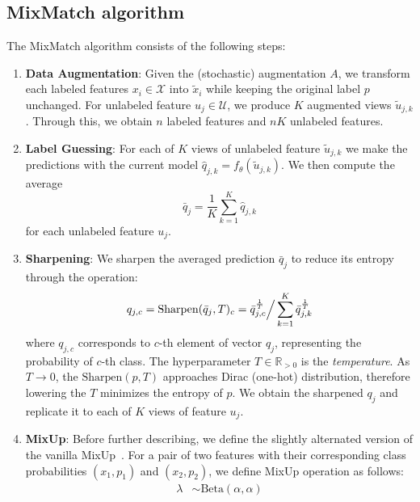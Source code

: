 \subsection{MixMatch algorithm}
The MixMatch algorithm consists of the following steps:
\begin{enumerate}
    \item \textbf{Data Augmentation}\label{data-augmentation}: Given the (stochastic) augmentation $A$, we transform each labeled features $x_i \in \mathcal{X}$ into $\tilde{x}_i$ while keeping the 
        original label $p$ unchanged. For unlabeled feature $u_j \in \mathcal{U}$, we produce $K$ augmented views $\tilde{u}_{j,k}$. Through this, we obtain $n$ labeled features and
        $nK$ unlabeled features. 
    \item \textbf{Label Guessing}\label{label-guessing}: For each of $K$ views of unlabeled feature $\tilde{u}_{j,k}$ we make the predictions with the current model 
        $\hat{q}_{j,k} = f_\theta(\tilde{u}_{j,k})$. We then compute the average
            \begin{equation*}
                \bar{q}_{j} = \frac{1}{K}\sum_{k=1}^K \hat{q}_{j,k}
            \end{equation*}
        for each unlabeled feature $u_j$.
    \item \textbf{Sharpening}\label{sharpening}: We sharpen the averaged prediction $\bar{q}_{j}$ to reduce its entropy through the operation:
            \begin{equation*}
                q_{j,c} = \text{Sharpen}(\bar{q}_{j},T)_c = \bar{q}_{j,c}^{\frac{1}{T}} \Big{/} \sum_{k=1}^{K} \bar{q}_{j,k}^{\frac{1}{T}} 
            \end{equation*}
        where $q_{j,c}$ corresponds to $c$-th element of vector $q_{j}$, representing the probability of $c$-th class. 
        The hyperparameter $T \in \mathbb{R}_{>0}$ is the \textit{temperature}. As $T\to 0$, the $\text{Sharpen}(p,T)$ approaches Dirac (one-hot) distribution, 
        therefore lowering the $T$ minimizes the entropy of $p$. We obtain the sharpened $q_{j}$ and replicate it to each of $K$ views of feature $u_{j}$.
    \item \textbf{MixUp}: Before further describing, we define the slightly alternated version of the vanilla MixUp~\cite{mixup-2018}.
        For a pair of two features with their corresponding class probabilities $(x_1,p_1)$ and $(x_2,p_2)$, we define MixUp operation as follows:
        \begin{align*}
            \lambda &\sim \text{Beta}(\alpha,\alpha) \\

\end{align*}
\end{enumerate}
